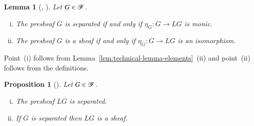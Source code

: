 \documentclass[1p]{elsarticle}
\makeatletter
\renewenvironment{proof}[1][\proofname]{\par
  \pushQED{\qed}%
  \normalfont \topsep6\p@\@plus6\p@\relax
  \trivlist
  \item[\hskip\labelsep
        \scshape
    #1\@addpunct{.}]\ignorespaces
}{%
  \popQED\endtrivlist\@endpefalse
}
\theoremstyle{mythm}
\newtheorem{Lem}[Thm]{Lemma}
\newtheorem{Prop}[Thm]{Proposition}
\theoremstyle{mydef}
\makeatother
\begin{document}
\begin{Lem}[{\cite[Lemma~2, p.~131]{MR1300636}, %
    \cite[A.7.11, (d), (e)]{MR1106918}}]
  \label{lem:separated-sheaves-via-eta}
  Let $G \in \operatorname{\mathscr{Y}}$.
  \begin{enumerate}[(i)]
    \item
      The presheaf $G$ is separated if and only if 
      $\eta_{G}: G \to LG$ is monic.
 
    \item
      The presheaf $G$ is a sheaf if and only if $\eta_{G}: G \to LG$
      is an isomorphism.
  \end{enumerate}
\end{Lem}
\begin{proof}
  Point~(i) follows from Lemma~\ref{lem:technical-lemma-elements}~(ii) and
  point~(ii) follows from the definitions.
\end{proof}

\begin{Prop}[{\cite[A.7.12]{MR1106918}}]
  \label{prop:LG-separated-LLG-sheaf}
  Let $G \in \operatorname{\mathscr{Y}}$.
  \begin{enumerate}[(i)]
    \item
      The presheaf $LG$ is separated.

    \item
      If $G$ is separated then $LG$ is a sheaf.
  \end{enumerate}
\end{Prop}
\end{document}
